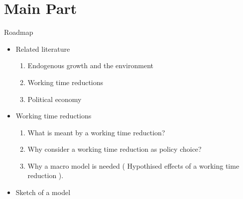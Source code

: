 \documentclass[11pt,aspectratio=169]{beamer}
\begin{document}
\section{Main Part}
\begin{frame}{Roadmap}
\begin{itemize}
\item Related literature %
\begin{enumerate}
\item Endogenous growth and the environment
\item Working time reductions
\item Political economy
\end{enumerate}
\item Working time reductions
\begin{enumerate}
	\item What is meant by a working time reduction? 
\item Why consider a working time reduction as policy choice? %
\item Why a macro model is needed ( Hypothised effects of a working time reduction ).
\end{enumerate}
\item Sketch of a model %
\end{itemize}
\end{frame}
\end{document}

